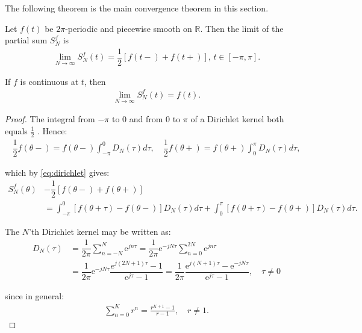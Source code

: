 The following theorem is the main convergence theorem in this section.
\begin{theorem} \label{theo:main_convergence}
Let $f(t)$ be $2\pi$-periodic and piecewise smooth on $\mathbb{R}$. Then the limit of the partial sum $S_N^f$ is
	\begin{align*}
		\lim_{N\to\infty} S_N^f (t) = \dfrac{1}{2}\left[f(t-) + 		f(t+)\right], \, t \in [-\pi, \pi].
	\end{align*}

If $f$ is continuous at $t$, then
	\begin{align*}
		\lim_{N\to \infty} S_N^f(t) = f(t).
	\end{align*}
\end{theorem}

\begin{proof}
The integral from $-\pi$ to $0$ and from $0$ to $\pi$ of a Dirichlet kernel both equals $\frac{1}{2}$ \cite{page 34-35, FAA}. Hence:
	\begin{align*}
		\dfrac{1}{2} f(\theta-) = f(\theta-) \int_{-\pi}^0 				D_N(\tau)d\tau, \quad \dfrac{1}{2}f(\theta+) = 					f(\theta+) \int_0^\pi D_N (\tau)d\tau,
	\end{align*}
	
	which by \eqref{eq:dirichlet} gives:
	\begin{align} \label{eq:S_N_proof}
		S_N^f(\theta) &- \dfrac{1}{2}\left[f(\theta-) + 				f(\theta+)\right] \nonumber \\
		&= \int_{-\pi}^0 \left[f(\theta + \tau) - f(\theta-) 			\right] D_N(\tau) d\tau + \int_0^\pi \left[f(\theta + 			\tau) - f(\theta+) \right] D_N(\tau) d\tau.
	\end{align}
	
	The $N$'th Dirichlet kernel may be written as:
	\begin{align} \label{eq:Dirichlet_proof}
		D_N(\tau) &= \dfrac{1}{2\pi}\sum_{n=-N}^{N}\text{e}^{j 			n \tau} = \dfrac{1}{2\pi} \text{e}^{-jN\tau} \sum_{n=0}			^{2N} \text{e}^{jn \tau} \nonumber \\
		&= \dfrac{1}{2\pi} \text{e}^{-jN\tau} \dfrac{e^{j(2N+1)			\tau}-1}{\text{e}^{j\tau}-1} = \dfrac{1}{2\pi} 					\dfrac{\text{e}^{j(N+1)\tau}-\text{e}^{-jN\tau}}				{\text{e}^{j\tau}-1}, \quad \tau \neq 0
	\end{align}
	
	since in general:
	\begin{align*}
		\sum_{n=0}^K r^n = \frac{r^{K+1}-1}{r-1}, \quad r \neq 			1.
	\end{align*}
	

\end{proof}
